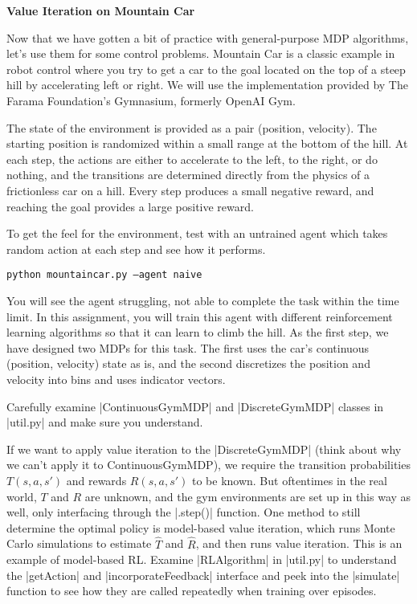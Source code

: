 \item {\bf Value Iteration on Mountain Car}

Now that we have gotten a bit of practice with general-purpose MDP algorithms, let's use them for some control problems.
Mountain Car is a classic example in robot control \cite{fn-7} where you try to get a car to the goal located on the top of a steep hill by accelerating left or right.
We will use the implementation provided by The Farama Foundation's Gymnasium, formerly OpenAI Gym.

The state of the environment is provided as a pair (position, velocity).
The starting position is randomized within a small range at the
bottom of the hill. At each step, the actions are either to accelerate to the left, to the right, or do nothing, and the transitions are
determined directly from the physics of a frictionless car on a hill. Every step produces a small negative reward, and reaching the goal provides a large
positive reward.

To get the feel for the environment, test with an untrained agent which takes random action at each step and see how it performs.

\texttt{python mountaincar.py --agent naive}

You will see the agent struggling, not able to complete the task within the time limit. 
In this assignment, you will train this agent with different reinforcement learning algorithms so that it can learn to climb the hill.
As the first step, we have designed two MDPs for this task. The first uses the car's continuous (position, velocity) state as is, and the second discretizes
the position and velocity into bins and uses indicator vectors.

Carefully examine |ContinuousGymMDP| and |DiscreteGymMDP| classes in |util.py| and make sure you understand.

If we want to apply value iteration to the |DiscreteGymMDP| (think about why we can't apply it to ContinuousGymMDP), 
we require the transition probabilities $T(s, a, s')$ and rewards $R(s, a, s')$ to be known. But oftentimes in the real world, $T$ and $R$ are unknown, 
and the gym environments are set up in this way as well, only interfacing through the |.step()| function. One method
to still determine the optimal policy is model-based value iteration, which runs Monte Carlo simulations to estimate $\hat{T}$ and $\hat{R}$, and then runs value iteration. 
This is an example of model-based RL. Examine |RLAlgorithm| in |util.py| to understand the |getAction| and |incorporateFeedback| interface 
and peek into the |simulate| function to see how they are called repeatedly when training over episodes.

\begin{enumerate}

  
  
  

\end{enumerate}
